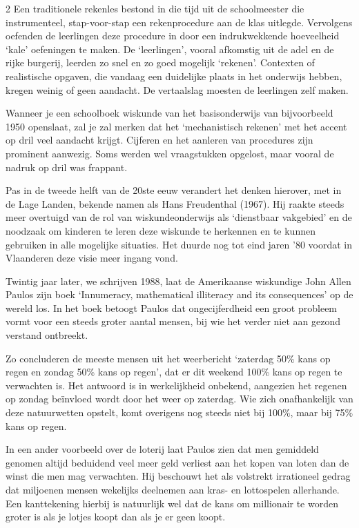 \begin{multicols}{2}
Een traditionele rekenles bestond in die tijd uit de schoolmeester die instrumenteel, stap-voor-stap een rekenprocedure aan de klas uitlegde. Vervolgens oefenden de leerlingen deze procedure in door een indrukwekkende hoeveelheid `kale' oefeningen te maken. De `leerlingen', vooral afkomstig uit de adel en de rijke burgerij, leerden zo snel en zo goed mogelijk `rekenen'. Contexten of realistische opgaven, die vandaag een duidelijke plaats in het onderwijs hebben, kregen weinig of geen aandacht. De vertaalslag moesten de leerlingen zelf maken. 

Wanneer je een schoolboek wiskunde van het basisonderwijs van bijvoorbeeld 1950 openslaat, zal je zal merken dat het `mechanistisch rekenen' met het accent op dril veel aandacht krijgt. Cijferen en het aanleren van procedures zijn prominent aanwezig. Soms werden wel vraagstukken opgelost, maar vooral de nadruk op dril was frappant. 

Pas in de tweede helft van de 20ste eeuw verandert het denken hierover, met in de Lage Landen, bekende namen als Hans Freudenthal (1967). Hij raakte steeds meer overtuigd van de rol van wiskundeonderwijs als `dienstbaar vakgebied' en de noodzaak om kinderen te leren deze wiskunde te herkennen en te kunnen gebruiken in alle mogelijke situaties. Het duurde nog tot eind jaren '80 voordat in Vlaanderen deze visie meer ingang vond. 

Twintig jaar later, we schrijven 1988, laat de Amerikaanse wiskundige John Allen Paulos zijn boek `Innumeracy, mathematical illiteracy and its consequences' op de wereld los. In het boek betoogt Paulos dat ongecijferdheid een groot probleem vormt voor een steeds groter aantal mensen, bij wie het verder niet aan gezond verstand ontbreekt. 

Zo concluderen de meeste mensen uit het weerbericht `zaterdag 50\% kans op regen en zondag 50\% kans op regen', dat er dit weekend 100\% kans op regen te verwachten is. Het antwoord is in werkelijkheid onbekend, aangezien het regenen op zondag beïnvloed wordt door het weer op zaterdag. Wie zich onafhankelijk van deze natuurwetten opstelt, komt overigens nog steeds niet bij 100$\%$, maar bij 75$\%$ kans op regen. 

In een ander voorbeeld over de loterij laat Paulos zien dat men gemiddeld genomen altijd beduidend veel meer geld verliest aan het kopen van loten dan de winst die men mag verwachten. Hij beschouwt het als volstrekt irrationeel gedrag dat miljoenen mensen wekelijks deelnemen aan kras- en lottospelen allerhande. Een kanttekening hierbij is natuurlijk wel dat de kans om millionair te worden groter is als je lotjes koopt dan als je er geen koopt. 

\end{multicols}
